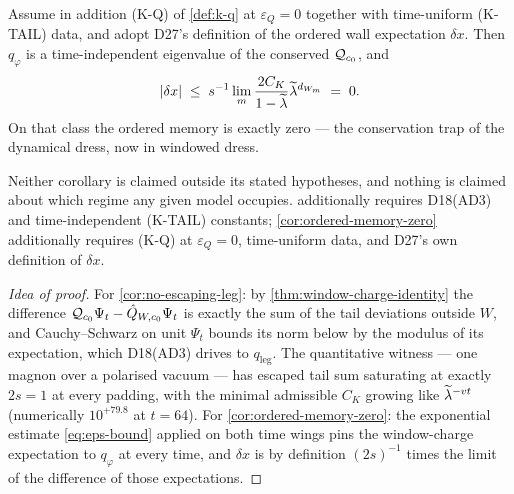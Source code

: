 \begin{corollary}
\label{cor:ordered-memory-zero}
\statusProvedConditional\;
Assume in addition (K-Q) of \cref{def:k-q} at $\varepsilon_Q=0$ together with
time-uniform (K-TAIL) data, and adopt D27's definition of the ordered wall
expectation $\delta x$. Then $q_\varphi$ is a time-independent eigenvalue of
the conserved $\mathcal{Q}_{c_0}$, and
\begin{equation}
  \lvert \delta x\rvert\;\le\;s^{-1}\lim_m\frac{2C_K}{1-\widetilde{\lambda}}\widetilde{\lambda}^{d_{W_m}}\;=\;0 .
  \label{eq:delta-x-zero}
\end{equation}
On that class the ordered memory is exactly zero --- the conservation trap of
the dynamical dress, now in windowed dress.
\end{corollary}

\begin{scope}
\label{scope:ld-id-corollaries}
Neither corollary is claimed outside its stated hypotheses, and nothing is
claimed about which regime any given model occupies.
 additionally requires D18(AD3) and time-independent
(K-TAIL) constants; \cref{cor:ordered-memory-zero} additionally requires (K-Q)
at $\varepsilon_Q=0$, time-uniform data, and D27's own definition of
$\delta x$.
\end{scope}

\begin{proof}[Idea of proof]
For \cref{cor:no-escaping-leg}: by
\cref{thm:window-charge-identity} the difference
$\mathcal{Q}_{c_0}\Psi_t-\hat{Q}_{W,c_0}\Psi_t$ is exactly the sum of the tail
deviations outside $W$, and Cauchy--Schwarz on unit $\Psi_t$ bounds its norm
below by the modulus of its expectation, which D18(AD3) drives to
$q_{\mathrm{leg}}$. The quantitative witness --- one magnon over a polarised
vacuum --- has escaped tail sum saturating at exactly $2s=1$ at every padding,
with the minimal admissible $C_K$ growing like $\widetilde{\lambda}^{-vt}$ (numerically
$10^{+79.8}$ at $t=64$). For \cref{cor:ordered-memory-zero}: the exponential
estimate \eqref{eq:eps-bound} applied on both time wings pins the window-charge
expectation to $q_\varphi$ at every time, and $\delta x$ is by definition
$(2s)^{-1}$ times the limit of the difference of those expectations.
\end{proof}


